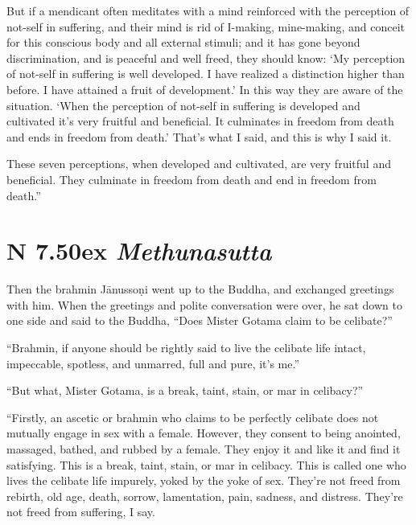 \documentclass[12pt,openany]{book}%
\newcommand*{\suttatitleacronym}[1]{\smaller[2]{#1}\vspace*{.3em}}
\newcommand*{\suttatitletranslation}[1]{\linebreak{#1}}
\newcommand*{\suttatitleroot}[1]{\linebreak\smaller[2]\itshape{#1}}
\newcommand*{\tocacronym}[1]{\hspace*{-3.3em}{#1}\quad}
\newcommand*{\toctranslation}[1]{#1}
\newcommand*{\tocroot}[1]{(\textit{#1})}
\begin{document}
But if a mendicant often meditates with a mind reinforced with the perception of not-self in suffering, and their mind is rid of  I-making, mine-making, and conceit for this conscious body and all external stimuli; and it has gone beyond discrimination, and is peaceful and well freed, they should know: ‘My perception of not-self in suffering is well developed. I have realized a distinction higher than before. I have attained a fruit of development.’ In this way they are aware of the situation. ‘When the perception of not-self in suffering is developed and cultivated it’s very fruitful and beneficial. It culminates in freedom from death and ends in freedom from death.’ That’s what I said, and this is why I said it. 

These seven perceptions, when developed and cultivated, are very fruitful and beneficial. They culminate in freedom from death and end in freedom from death.” 

%
\section*{{\suttatitleacronym AN 7.50}{\suttatitletranslation Sex }{\suttatitleroot Methunasutta}}
\addcontentsline{toc}{section}{\tocacronym{AN 7.50} \toctranslation{Sex } \tocroot{Methunasutta}}

Then the brahmin \textsanskrit{Jānussoṇi} went up to the Buddha, and exchanged greetings with him. When the greetings and polite conversation were over, he sat down to one side and said to the Buddha, “Does Mister Gotama claim to be celibate?” 

“Brahmin, if anyone should be rightly said to live the celibate life intact, impeccable, spotless, and unmarred, full and pure, it’s me.” 

“But what, Mister Gotama, is a break, taint, stain, or mar in celibacy?” 

“Firstly, an ascetic or brahmin who claims to be perfectly celibate does not mutually engage in sex with a female. However, they consent to being anointed, massaged, bathed, and rubbed by a female. They enjoy it and like it and find it satisfying. This is a break, taint, stain, or mar in celibacy. This is called one who lives the celibate life impurely, yoked by the yoke of sex. They’re not freed from rebirth, old age, death, sorrow, lamentation, pain, sadness, and distress. They’re not freed from suffering, I say. 
\end{document}
